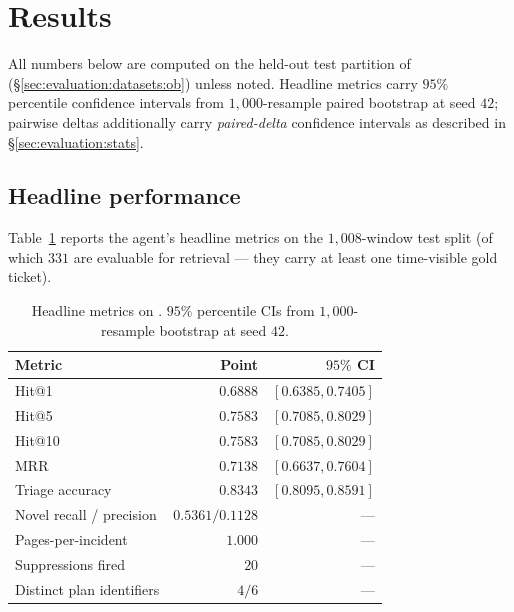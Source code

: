 %

\section{Results}
\label{sec:results}

All numbers below are computed on the held-out test partition of \dsob{} (\S\ref{sec:evaluation:datasets:ob}) unless noted. Headline metrics carry $95\%$ percentile confidence intervals from $1{,}000$-resample paired bootstrap at seed $42$; pairwise deltas additionally carry \emph{paired-delta} confidence intervals as described in \S\ref{sec:evaluation:stats}.

\subsection{Headline performance}
\label{sec:results:headline}

Table~\ref{tab:headline-ob} reports the agent's headline metrics on the $1{,}008$-window \dsob{} test split (of which $331$ are evaluable for retrieval --- they carry at least one time-visible gold ticket).

\begin{table}[ht]
  \centering
  \caption{Headline metrics on \dsob{}. $95\%$ percentile CIs from $1{,}000$-resample bootstrap at seed $42$.}
  \label{tab:headline-ob}
  \small
  \begin{tabular}{lrr}
    \toprule
    Metric & Point & $95\%$ CI \\
    \midrule
    Hit@1                       & $0.6888$ & $[0.6385, 0.7405]$ \\
    Hit@5                       & $0.7583$ & $[0.7085, 0.8029]$ \\
    Hit@10                      & $0.7583$ & $[0.7085, 0.8029]$ \\
    MRR                         & $0.7138$ & $[0.6637, 0.7604]$ \\
    Triage accuracy             & $0.8343$ & $[0.8095, 0.8591]$ \\
    Novel recall / precision    & $0.5361 / 0.1128$ & --- \\
    Pages-per-incident          & $1.000$  & --- \\
    Suppressions fired          & $20$     & --- \\
    Distinct plan identifiers   & $4 / 6$  & --- \\
    \bottomrule
  \end{tabular}
\end{table}


